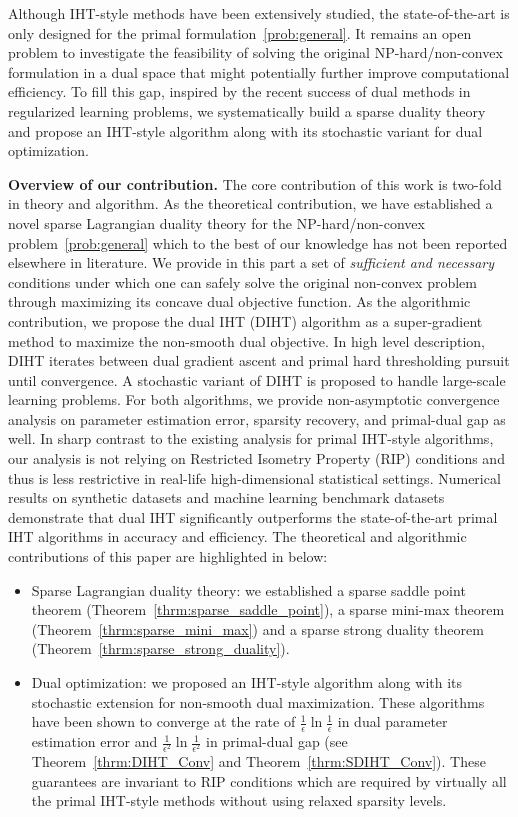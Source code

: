\documentclass[11pt]{article}
\numberwithin{equation}{section}
\numberwithin{table}{section}
\numberwithin{figure}{section}
\begin{document}
Although IHT-style methods have been extensively studied, the state-of-the-art is only designed for the primal formulation~\eqref{prob:general}. It remains an open problem to investigate the feasibility of solving the original NP-hard/non-convex formulation in a dual space that might potentially further improve computational efficiency. To fill this gap, inspired by the recent success of dual methods in regularized learning problems, we systematically build a sparse duality theory and propose an IHT-style algorithm along with its stochastic variant for dual optimization.

\noindent\textbf{Overview of our contribution.} The core contribution of this work is two-fold in theory and algorithm. As the theoretical contribution, we have established a novel sparse Lagrangian duality theory for the NP-hard/non-convex problem~\eqref{prob:general} which to the best of our knowledge has not been reported elsewhere in literature. We provide in this part a set of \emph{sufficient and necessary} conditions under which one can safely solve the original non-convex problem through maximizing its concave dual objective function. As the algorithmic contribution, we propose the dual IHT (DIHT) algorithm as a super-gradient method to maximize the non-smooth dual objective. In high level description, DIHT iterates between dual gradient ascent and primal hard thresholding pursuit until convergence. A stochastic variant of DIHT is proposed to handle large-scale learning problems. For both algorithms, we provide non-asymptotic convergence analysis on parameter estimation error, sparsity recovery, and primal-dual gap as well. In sharp contrast to the existing analysis for primal IHT-style algorithms, our analysis is not relying on Restricted Isometry Property (RIP) conditions and thus is less restrictive in real-life high-dimensional statistical settings. Numerical results on synthetic datasets and machine learning benchmark datasets demonstrate that dual IHT significantly outperforms the state-of-the-art primal IHT algorithms in accuracy and efficiency. The theoretical and algorithmic contributions of this paper are highlighted in below:
\begin{itemize}
  \item Sparse Lagrangian duality theory: we established a sparse saddle point theorem (Theorem~\ref{thrm:sparse_saddle_point}), a sparse mini-max theorem (Theorem~\ref{thrm:sparse_mini_max}) and a sparse strong duality theorem (Theorem~\ref{thrm:sparse_strong_duality}).
  \item Dual optimization: we proposed an IHT-style algorithm along with its stochastic extension for non-smooth dual maximization. These algorithms have been shown to converge at the rate of $\frac{1}{\epsilon} \ln \frac{1}{\epsilon}$ in dual parameter estimation error and $\frac{1}{\epsilon^2} \ln \frac{1}{\epsilon^2}$ in primal-dual gap (see Theorem~\ref{thrm:DIHT_Conv} and Theorem~\ref{thrm:SDIHT_Conv}). These guarantees are invariant to RIP conditions which are required by virtually all the primal IHT-style methods without using relaxed sparsity levels.
\end{itemize}
\end{document}
